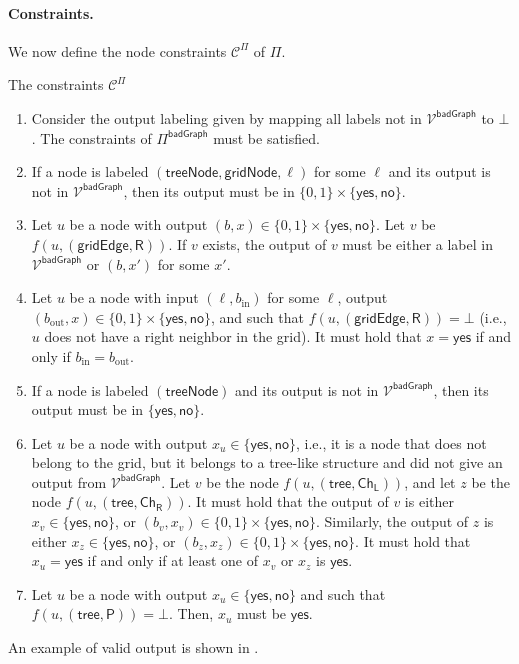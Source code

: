 \documentclass[11pt]{article}
\newcommand{\lparent}{\mathsf {P}}
\newcommand{\lright}{\mathsf {R}}
\newcommand{\llch}{\ensuremath{\mathsf {Ch_L}}}
\newcommand{\lrch}{\ensuremath{\mathsf {Ch_R}}}
\newcommand{\lgridedge}{\mathsf {gridEdge}}
\newcommand{\lgridnode}{\mathsf {gridNode}}
\newcommand{\ltreenode}{\mathsf {treeNode}}
\newcommand{\ltreelike}{\mathsf {tree}}
\newcommand{\lbadgraph}{\mathsf {badGraph}}
\newcommand{\lyes}{\mathsf {yes}}
\newcommand{\lno}{\mathsf {no}}
\begin{document}
\paragraph{Constraints.}
We now define the node constraints $\mathcal{C}^\Pi$ of $\Pi$.
\begin{myframe}{The constraints $\mathcal{C}^{\Pi}$}
\begin{enumerate}
	\item Consider the output labeling given by mapping all labels not in $\mathcal{V^\lbadgraph}$ to $\bot$. The constraints of $\Pi^\mathcal{\lbadgraph}$ must be satisfied.\label{constr:pi:bad}
	
	\item If a node is labeled $(\ltreenode,\lgridnode,\ell)$ for some $\ell$ and its output is not in $\mathcal{V^\lbadgraph}$, then its output must be in  $\{0,1\} \times \{\lyes,\lno\}$. \label{constr:pi:grid}
	
	\item Let $u$ be a node with output $(b,x) \in \{0,1\} \times \{\lyes,\lno\}$. Let $v$ be $f(u,(\lgridedge,\lright))$. If $v$ exists, the output of $v$ must be either a label in $\mathcal{V^\lbadgraph}$ or $(b,x')$ for some $x'$. \label{constr:pi:grid-same-output}
	
	\item Let $u$ be a node with input $(\ell,b_\mathrm{in})$ for some $\ell$, output $(b_\mathrm{out},x) \in \{0,1\} \times \{\lyes,\lno\}$, and such that $f(u,(\lgridedge,\lright)) = \bot$ (i.e., $u$ does not have a right neighbor in the grid). It must hold that $x = \lyes$ if and only if $b_\mathrm{in} = b_\mathrm{out}$. \label{constr:pi:basecase}
	
	\item If a node is labeled $(\ltreenode)$ and its output is not in $\mathcal{V^\lbadgraph}$, then its output must be in $\{\lyes, \lno\}$. \label{constr:pi:tree}
	
	
	\item Let $u$ be a node with output $x_u \in \{\lyes,\lno\}$, i.e., it is a node that does not belong to the grid, but it belongs to a tree-like structure and did not give an output from $\mathcal{V^\lbadgraph}$. Let $v$ be the node $f(u,(\ltreelike,\llch))$, and let $z$ be the node $f(u,(\ltreelike,\lrch))$. It must hold that the output of $v$ is either $x_v \in \{\lyes,\lno\}$, or $(b_v,x_v) \in \{0,1\} \times \{\lyes,\lno\}$. Similarly, the output of $z$ is either $x_z \in \{\lyes,\lno\}$, or $(b_z,x_z) \in \{0,1\} \times \{\lyes,\lno\}$. It must hold that $x_u = \lyes$ if and only if at least one of $x_v$ or $x_z$ is $\lyes$. \label{constr:pi:or}
	
	\item Let $u$ be a node with output $x_u \in \{\lyes,\lno\}$ and such that $f(u,(\ltreelike,\lparent)) = \bot$. Then, $x_u$ must be $\lyes$. \label{constr:pi:yes}
\end{enumerate}
\end{myframe}
\noindent An example of valid output is shown in .
\end{document}
